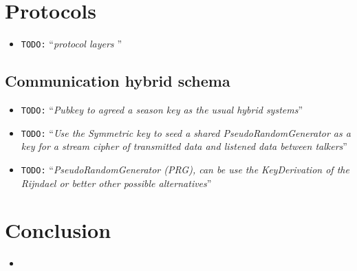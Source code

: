 \documentclass[10pt,a4paper,twoside]{llncs}
\newcommand{\todo}[1]{\texttt{\color{red}TODO:} ``\emph{#1}''}
\begin{document}
%
\section{Protocols}

\begin{itemize}
 \item \todo{protocol layers \cite{Schneier:1995:ACP:572932}}
\end{itemize}

%
\subsection{Communication hybrid schema \label{sec:intercom}}

\begin{itemize}
 \item \todo{Pubkey to agreed a season key as the usual hybrid systems}
 \item \todo{Use the Symmetric key to seed a shared PseudoRandomGenerator as a key for a stream cipher of transmitted data and listened data between talkers}
 \item \todo{\emph{PseudoRandomGenerator} (PRG), can be use the KeyDerivation of the Rijndael or better other possible alternatives}
\end{itemize}

%
\section{Conclusion \label{sec:conclusions}}

\begin{itemize}
 \item 
\end{itemize}



\end{document}
